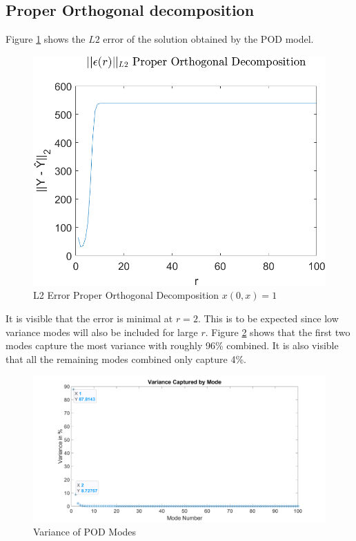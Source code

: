 \subsection{Proper Orthogonal decomposition}
Figure \ref{FIG-ERR-POD} shows the \(L2\) error of the solution obtained by the POD model.
\begin{figure}[H]
\centering
\includegraphics[width=12.5cm]{images/L2_POD}
\caption{L2 Error Proper Orthogonal Decomposition $x(0, x) = 1$}
\label{FIG-ERR-POD}
\end{figure}
It is visible that the error is minimal at  \(r=2\).
This is to be expected since low variance modes will also be included for large \(r\).
Figure \ref{FIG-POD-VAR} shows that the first two modes capture the most variance with roughly 96\% combined.
It is also visible that all the remaining modes combined only capture 4\%.
\begin{figure}[H]
\centering
\includegraphics[width=12.5cm]{images/test_modes_pod}
\caption{Variance of POD Modes}
\label{FIG-POD-VAR}
\end{figure}
